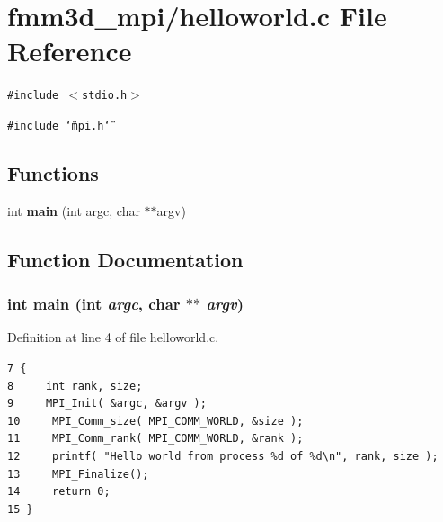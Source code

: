 \section{fmm3d\_\-mpi/helloworld.c File Reference}
\label{helloworld_8c}


{\tt \#include $<$stdio.h$>$}\par
{\tt \#include \char`\"{}mpi.h\char`\"{}}\par
\subsection*{Functions}
\begin{CompactItemize}
\item 
int {\bf main} (int argc, char $\ast$$\ast$argv)
\end{CompactItemize}


\subsection{Function Documentation}
\subsubsection{\setlength{\rightskip}{0pt plus 5cm}int main (int {\em argc}, char $\ast$$\ast$ {\em argv})}\label{helloworld_8c_30c4c19ff69d905e8e4c750b3af23485_30c4c19ff69d905e8e4c750b3af23485}




Definition at line 4 of file helloworld.c.

\footnotesize\begin{verbatim}7 {
8     int rank, size;
9     MPI_Init( &argc, &argv );
10     MPI_Comm_size( MPI_COMM_WORLD, &size );
11     MPI_Comm_rank( MPI_COMM_WORLD, &rank );
12     printf( "Hello world from process %d of %d\n", rank, size );
13     MPI_Finalize();
14     return 0;
15 }
\end{verbatim}\normalsize 


